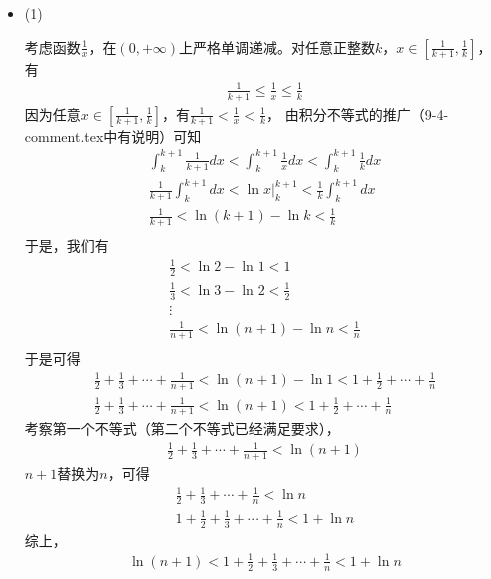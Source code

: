 \documentclass{article}
\begin{document}
\begin{itemize}
  \item (1)

        考虑函数$\frac{1}{x}$，在$(0, +\infty)$上严格单调递减。对任意正整数$k$，$x \in [\frac{1}{k + 1}, \frac{1}{k}]$，有
        \begin{align*}
          \frac{1}{k + 1} \leq \frac{1}{x} \leq \frac{1}{k}
        \end{align*}
        因为任意$x \in [\frac{1}{k + 1}, \frac{1}{k}]$，有$\frac{1}{k + 1} < \frac{1}{x} < \frac{1}{k}$，
        由积分不等式的推广（9-4-comment.tex中有说明）可知
        \begin{align*}
          \int_{k}^{k + 1} \frac{1}{k + 1} dx < \int_{k}^{k + 1} \frac{1}{x} dx < \int_{k}^{k + 1} \frac{1}{k} dx \\
          \frac{1}{k + 1} \int_{k}^{k + 1} dx < \ln x \bigg|_{k}^{k + 1} < \frac{1}{k} \int_{k}^{k + 1}  dx       \\
          \frac{1}{k + 1} < \ln (k + 1) - \ln k < \frac{1}{k}                                                     \\
        \end{align*}
        于是，我们有
        \begin{align*}
          \frac{1}{2} < \ln 2 - \ln 1 < 1                   \\
          \frac{1}{3} < \ln 3 - \ln 2 < \frac{1}{2}         \\
          \vdots                                            \\
          \frac{1}{n+1} < \ln (n + 1) - \ln n < \frac{1}{n} \\
        \end{align*}
        于是可得
        \begin{align*}
          \frac{1}{2} + \frac{1}{3} + \cdots + \frac{1}{n+1} < \ln (n + 1) - \ln 1 < 1 + \frac{1}{2} + \cdots + \frac{1}{n} \\
          \frac{1}{2} + \frac{1}{3} + \cdots + \frac{1}{n+1} < \ln (n + 1) < 1 + \frac{1}{2} + \cdots + \frac{1}{n}
        \end{align*}
        考察第一个不等式（第二个不等式已经满足要求），
        \begin{align*}
          \frac{1}{2} + \frac{1}{3} + \cdots + \frac{1}{n+1} < \ln (n + 1)
        \end{align*}
        $n + 1$替换为$n$，可得
        \begin{align*}
          \frac{1}{2} + \frac{1}{3} + \cdots + \frac{1}{n} < \ln n \\
          1 + \frac{1}{2} + \frac{1}{3} + \cdots + \frac{1}{n} < 1 + \ln n
        \end{align*}
        综上，
        \begin{align*}
          \ln (n + 1) < 1 + \frac{1}{2} + \frac{1}{3} + \cdots + \frac{1}{n} < 1 + \ln n
        \end{align*}


\end{itemize}
\end{document}
